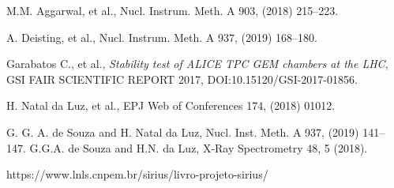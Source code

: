 \documentclass{report}
\begin{document}
\begin{thebibliography}{9}
 M.M. Aggarwal, et al., Nucl. Instrum. Meth. A 903, (2018) 215–223. 

 A. Deisting, et al., Nucl. Instrum. Meth. A 937, (2019) 168–180.


%
 Garabatos C., et al., \textit{Stability test of ALICE TPC GEM chambers at the LHC}, GSI FAIR SCIENTIFIC REPORT 2017, DOI:10.15120/GSI-2017-01856.
%

 H. Natal da Luz, et al., EPJ Web of Conferences 174, (2018) 01012.




 G. G. A. de Souza and  H. Natal da Luz, Nucl. Inst. Meth. A 937, (2019) 141–147.
\thispagestyle{plain}
 G.G.A. de Souza and H.N. da Luz, X-Ray Spectrometry 48, 5 (2018).

 https://www.lnls.cnpem.br/sirius/livro-projeto-sirius/
\thispagestyle{plain}



\end{thebibliography}
\newpage
\end{document}
